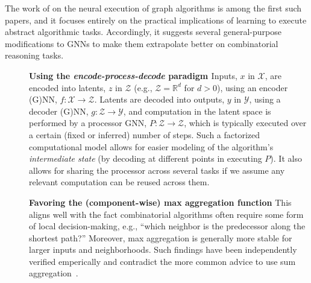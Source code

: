 \documentclass[twoside,11pt]{article}
\newcommand{\cm}[1]{{{\textcolor{orange}{\textbf{[CM:} {#1}\textbf{]}}}}}
\begin{document}
The work of \citet{Velickovic2020a} on the neural execution of graph algorithms is among the first such papers, and it focuses entirely on the practical implications of learning to execute abstract algorithmic tasks. Accordingly, it suggests several general-purpose modifications to GNNs to make them extrapolate better on combinatorial reasoning tasks.

\begin{description}
	\item[] \textbf{Using the \emph{encode-process-decode} paradigm \citep{hamrick2018relational}}  Inputs, $x$ in $\mathcal{X}$, are encoded into latents, $z$ in $\mathcal{Z}$ (e.g., $\mathcal{Z}=\mathbb{R}^d$ for $d>0$), using an encoder (G)NN, $f \colon \mathcal{X}\rightarrow\mathcal{Z}$. Latents are decoded into outputs, $y$ in $\mathcal{Y}$, using a decoder (G)NN, $g \colon \mathcal{Z}\rightarrow\mathcal{Y}$, and computation in the latent space is performed by a processor GNN, $P \colon \mathcal{Z}\rightarrow\mathcal{Z}$, which is typically executed over a certain (fixed or inferred) number of steps. Such a factorized computational model allows for easier modeling of the algorithm's \emph{intermediate state} (by decoding at different points in executing $P$). It also allows for sharing the processor across several tasks if we assume any relevant computation can be reused across them.
	\item[] \textbf{Favoring the (component-wise) max aggregation function} This aligns well with the fact  combinatorial algorithms often require some form of local decision-making, e.g., ``which neighbor is the predecessor along the shortest path?'' Moreover, max aggregation is generally more stable for larger inputs and neighborhoods. Such findings have been independently verified emperically \citep{Joshi2020,Richter2020,Corso2020} and contradict the more common advice to use  sum aggregation~\citep{Xu2019}.

\end{description}
\end{document}
